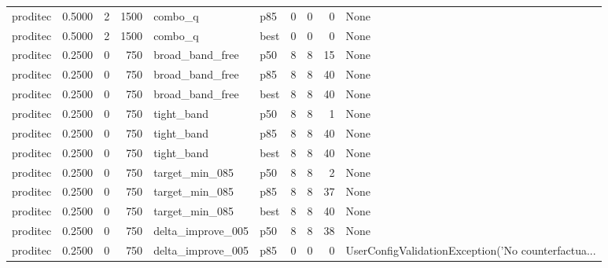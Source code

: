 \begin{tabular}{lrrrllrrrl}
proditec &    0.5000 &    2 &   1500 &              combo\_q &    p85 &               0 &          0 &       0 &                                               None \\
proditec &    0.5000 &    2 &   1500 &              combo\_q &   best &               0 &          0 &       0 &                                               None \\
proditec &    0.2500 &    0 &    750 &      broad\_band\_free &    p50 &               8 &          8 &      15 &                                               None \\
proditec &    0.2500 &    0 &    750 &      broad\_band\_free &    p85 &               8 &          8 &      40 &                                               None \\
proditec &    0.2500 &    0 &    750 &      broad\_band\_free &   best &               8 &          8 &      40 &                                               None \\
proditec &    0.2500 &    0 &    750 &           tight\_band &    p50 &               8 &          8 &       1 &                                               None \\
proditec &    0.2500 &    0 &    750 &           tight\_band &    p85 &               8 &          8 &      40 &                                               None \\
proditec &    0.2500 &    0 &    750 &           tight\_band &   best &               8 &          8 &      40 &                                               None \\
proditec &    0.2500 &    0 &    750 &       target\_min\_085 &    p50 &               8 &          8 &       2 &                                               None \\
proditec &    0.2500 &    0 &    750 &       target\_min\_085 &    p85 &               8 &          8 &      37 &                                               None \\
proditec &    0.2500 &    0 &    750 &       target\_min\_085 &   best &               8 &          8 &      40 &                                               None \\
proditec &    0.2500 &    0 &    750 &    delta\_improve\_005 &    p50 &               8 &          8 &      38 &                                               None \\
proditec &    0.2500 &    0 &    750 &    delta\_improve\_005 &    p85 &               0 &          0 &       0 & UserConfigValidationException('No counterfactua... \\

\end{tabular}
